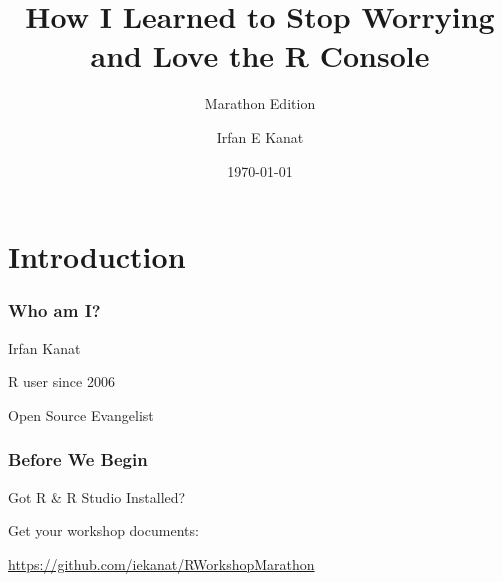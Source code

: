 \documentclass{beamer}\usepackage[]{graphicx}\usepackage[]{color}
\newcommand\makebeamertitle{\frame{\maketitle}}%
\begin{document}
\title[R Workshop]{How I Learned to Stop Worrying and Love the R Console}
\subtitle{Marathon Edition}

\author[Irfan Kanat]{Irfan E Kanat}



\date{\today}



\makebeamertitle


\section{Introduction}

\begin{frame}
\frametitle{Who am I?}

Irfan Kanat

\vspace*{2em} R user since 2006

\vspace*{2em} Open Source Evangelist

\end{frame}


\begin{frame}[fragile]
\frametitle{Before We Begin}
{\Large
Got R \& R Studio Installed? \vfill

Get your workshop documents: \vfill

\href{https://github.com/iekanat/RWorkshopMarathon}{https://github.com/iekanat/RWorkshopMarathon} \vfill

}
\end{frame}
\end{document}
